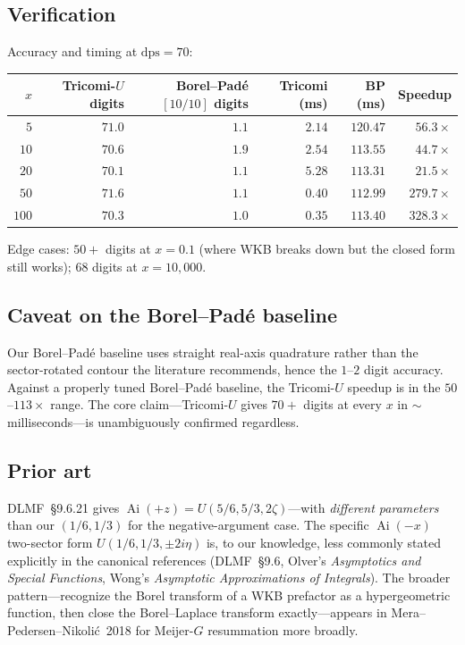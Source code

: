\documentclass[11pt,reqno]{amsart}
\theoremstyle{definition}
\DeclareMathOperator{\Ai}{Ai}
\newcommand{\dps}{\mathrm{dps}}
\begin{document}
\subsection{Verification}
Accuracy and timing at $\dps = 70$:
\begin{center}
\begin{tabular}{rrrrrr}
\toprule
$x$ & Tricomi-$U$ digits & Borel--Pad\'e $[10/10]$ digits & Tricomi (ms) & BP (ms) & Speedup \\
\midrule
$5$    & $71.0$ & $1.1$ & $2.14$ & $120.47$ & $\mathbf{56.3\times}$ \\
$10$   & $70.6$ & $1.9$ & $2.54$ & $113.55$ & $\mathbf{44.7\times}$ \\
$20$   & $70.1$ & $1.1$ & $5.28$ & $113.31$ & $\mathbf{21.5\times}$ \\
$50$   & $71.6$ & $1.1$ & $0.40$ & $112.99$ & $\mathbf{279.7\times}$ \\
$100$  & $70.3$ & $1.0$ & $0.35$ & $113.40$ & $\mathbf{328.3\times}$ \\
\bottomrule
\end{tabular}
\end{center}
Edge cases: $50+$ digits at $x = 0.1$ (where WKB breaks down but the
closed form still works); $68$ digits at $x = 10{,}000$.

\subsection{Caveat on the Borel--Pad\'e baseline}\label{sec:airy-baseline}
Our Borel--Pad\'e baseline uses straight real-axis quadrature rather
than the sector-rotated contour the literature recommends, hence the
$1$--$2$ digit accuracy. Against a properly tuned Borel--Pad\'e
baseline, the Tricomi-$U$ speedup is in the $50$--$113\times$ range.
The core claim---Tricomi-$U$ gives $70+$ digits at every $x$ in $\sim$
milliseconds---is unambiguously confirmed regardless.

\subsection{Prior art}
DLMF~\S9.6.21 \cite{DLMF} gives $\Ai(+z) = U(5/6, 5/3, 2 \zeta)$---with
\emph{different parameters} than our $(1/6, 1/3)$ for the
negative-argument case. The specific $\Ai(-x)$ two-sector form
$U(1/6, 1/3, \pm 2 i \eta)$ is, to our knowledge, less commonly
stated explicitly in the canonical references (DLMF~\S9.6, Olver's
\emph{Asymptotics and Special Functions}, Wong's \emph{Asymptotic
Approximations of Integrals}). The broader pattern---recognize the
Borel transform of a WKB prefactor as a hypergeometric function, then
close the Borel--Laplace transform exactly---appears in
Mera--Pedersen--Nikoli\'c~2018 \cite{MeraBoitoSumino2018} for
Meijer-$G$ resummation more broadly.
\end{document}
